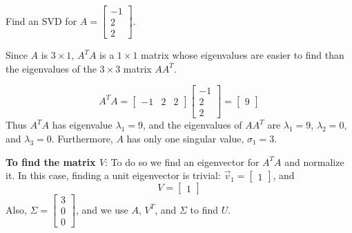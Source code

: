 \documentclass{ximera}
\begin{document}
\begin{example}\label{ex:SVD3x1}
Find an SVD for
$A=\left[\begin{array}{r} -1 \\ 2\\ 2 \end{array}\right]$.

\begin{explanation}
Since $A$ is $3\times 1$, $A^T A$ is a $1\times 1$ matrix
whose eigenvalues are easier to find than the eigenvalues of
the $3\times 3$ matrix $AA^T$.

\[ A^TA=\left[\begin{array}{ccc} -1 & 2 & 2 \end{array}\right]
\left[\begin{array}{r} -1 \\ 2 \\ 2 \end{array}\right]
=\left[\begin{array}{r} 9 \end{array}\right]\]
Thus $A^TA$ has eigenvalue $\lambda_1=9$, and
the eigenvalues of $AA^T$ are $\lambda_1=9$, $\lambda_2=0$, and
$\lambda_3=0$.
Furthermore, $A$ has only one singular value, $\sigma_1=3$.

\textbf{To find the matrix $V$}:
To do so we find an eigenvector for $A^TA$ and
normalize it.
In this case, finding a unit eigenvector is trivial:
$\vec{v}_1=\left[\begin{array}{r} 1 \end{array}\right]$, and
\[ V=\left[\begin{array}{r} 1 \end{array}\right]\]
Also,
$\Sigma =\left[\begin{array}{r} 3 \\ 0\\ 0 \end{array}\right]$,
and we use $A$, $V^T$, and $\Sigma$ to find $U$.


\end{explanation}
\end{example}
\end{document}
